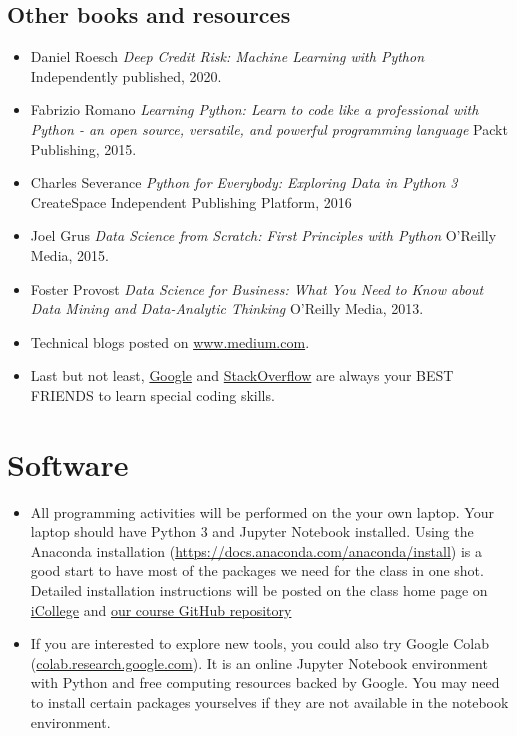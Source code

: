 \documentclass[a4paper, 12pt]{article}
\begin{document}
\subsection{Other books and resources}
  \begin{itemize}
    \item Daniel Roesch \textit{Deep Credit Risk: Machine Learning with Python} Independently published, 2020.
  	\item Fabrizio Romano  \textit{Learning Python: Learn to code like a professional with Python - an open source, versatile, and powerful programming language} Packt Publishing, 2015.
  	\item Charles Severance \textit{Python for Everybody: Exploring Data in Python 3} CreateSpace Independent Publishing Platform, 2016 
    \item Joel Grus \textit{Data Science from Scratch: First Principles with Python} O'Reilly Media, 2015.
    \item Foster Provost \textit{Data Science for Business: What You Need to Know about Data Mining and Data-Analytic Thinking} O'Reilly Media, 2013.
    \item Technical blogs posted on \url{www.medium.com}.
    \item Last but not least, \href{www.google.com}{Google} and \href{www.stackoverflow.com}{StackOverflow} are always your BEST FRIENDS to learn special coding skills.
  \end{itemize}

\section{Software}
\begin{itemize}
    \item All programming activities will be performed on the your own laptop. Your laptop should have Python 3 and Jupyter Notebook installed. Using the Anaconda installation (\url{https://docs.anaconda.com/anaconda/install}) is a good start to have most of the packages we need for the class in one shot. Detailed installation instructions will be posted on the class home page on \href{https://gastate.view.usg.edu/d2l/home/3259801}{iCollege} and \href{https://github.com/xiangshiyin/machine-learning-for-actuarial-science}{our course GitHub repository}
    \item If you are interested to explore new tools, you could also try Google Colab (\url{colab.research.google.com}). It is an online Jupyter Notebook environment with Python and free computing resources backed by Google. You may need to install certain packages yourselves if they are not available in the notebook environment.
\end{itemize}  
\end{document}
